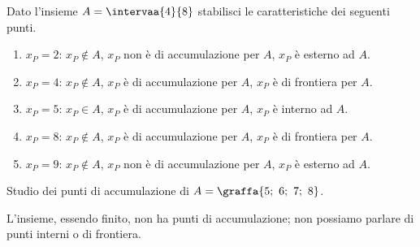
\begin{esempio}
Dato l'insieme \(A = \intervaa{4}{8}\) 
stabilisci le caratteristiche dei seguenti punti.
\begin{enumerate} [noitemsep, label=\alph*)]
\item \(x_P= 2\): \quad  \(x_P \notin A\), 
\(x_P\) non è di accumulazione per \(A\), \(x_P\) è esterno ad \(A\).
\item \(x_P= 4\): \quad  \(x_P \notin A\), 
\(x_P\) è di accumulazione per \(A\), \(x_P\) è di frontiera per \(A\).
\item \(x_P= 5\): \quad  \(x_P \in A\), 
\(x_P\) è di accumulazione per \(A\), \(x_P\) è interno ad \(A\).
\item \(x_P= 8\): \quad  \(x_P \notin A\), 
\(x_P\) è di accumulazione per \(A\), \(x_P\) è di frontiera per \(A\).
\item \(x_P= 9\): \quad  \(x_P \notin A\), 
\(x_P\) non è di accumulazione per \(A\), \(x_P\) è esterno ad \(A\).
\end{enumerate}
\end{esempio}

\begin{esempio}
Studio dei punti di accumulazione di \(A = \graffa{5;~6;~7;~8}\).

L'insieme, essendo finito, non ha punti di accumulazione; 
non possiamo parlare di punti interni o di frontiera.
\end{esempio}

